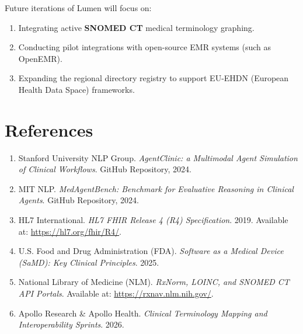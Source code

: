 \documentclass[10pt,journal,compsoc]{IEEEtran}
\begin{document}
Future iterations of Lumen will focus on:
\begin{enumerate}
    \item Integrating active \textbf{SNOMED CT} medical terminology graphing.
    \item Conducting pilot integrations with open-source EMR systems (such as OpenEMR).
    \item Expanding the regional directory registry to support EU-EHDN (European Health Data Space) frameworks.
\end{enumerate}

\section{References}
\begin{enumerate}
    \item Stanford University NLP Group. \textit{AgentClinic: a Multimodal Agent Simulation of Clinical Workflows}. GitHub Repository, 2024.
    \item MIT NLP. \textit{MedAgentBench: Benchmark for Evaluative Reasoning in Clinical Agents}. GitHub Repository, 2024.
    \item HL7 International. \textit{HL7 FHIR Release 4 (R4) Specification}. 2019. Available at: \url{https://hl7.org/fhir/R4/}.
    \item U.S. Food and Drug Administration (FDA). \textit{Software as a Medical Device (SaMD): Key Clinical Principles}. 2025.
    \item National Library of Medicine (NLM). \textit{RxNorm, LOINC, and SNOMED CT API Portals}. Available at: \url{https://rxnav.nlm.nih.gov/}.
    \item Apollo Research \& Apollo Health. \textit{Clinical Terminology Mapping and Interoperability Sprints}. 2026.
\end{enumerate}
\end{document}
